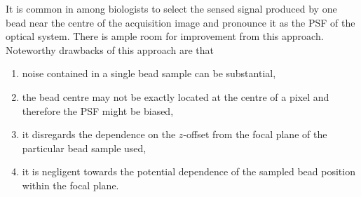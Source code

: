 It is common in among biologists to select the sensed signal produced by one bead near the centre of the acquisition 
    image and pronounce it as the \ac{PSF} of the optical system.
There is ample room for improvement from this approach. 
Noteworthy drawbacks of this approach are that
    \begin{enumerate}[label=(\alph*)]
        \item noise contained in a single bead sample can be substantial, 
        \item the bead centre may not be exactly located at the centre of a pixel and therefore the \ac{PSF} might be 
            biased, 
        \item it disregards the dependence on the \(z\)-offset from the focal plane of the particular bead 
            sample used, 
        \item it is negligent towards the potential dependence of the sampled bead position within the focal plane.
    \end{enumerate}

